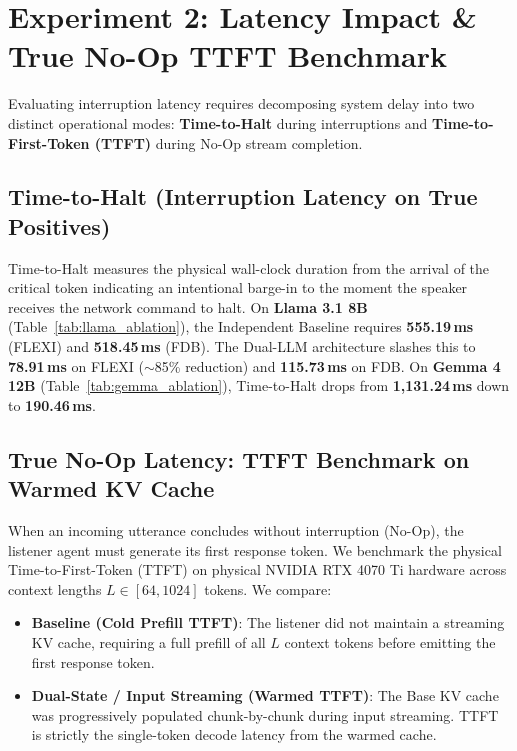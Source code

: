 \documentclass{article}
\begin{document}
\section{Experiment 2: Latency Impact \& True No-Op TTFT Benchmark}

Evaluating interruption latency requires decomposing system delay into two distinct operational modes: \textbf{Time-to-Halt} during interruptions and \textbf{Time-to-First-Token (TTFT)} during No-Op stream completion.

\subsection{Time-to-Halt (Interruption Latency on True Positives)}
Time-to-Halt measures the physical wall-clock duration from the arrival of the critical token indicating an intentional barge-in to the moment the speaker receives the network command to halt. 
On \textbf{Llama 3.1 8B} (Table~\ref{tab:llama_ablation}), the Independent Baseline requires \textbf{555.19\,ms} (FLEXI) and \textbf{518.45\,ms} (FDB). The Dual-LLM architecture slashes this to \textbf{78.91\,ms} on FLEXI ($\sim$85\% reduction) and \textbf{115.73\,ms} on FDB. On \textbf{Gemma 4 12B} (Table~\ref{tab:gemma_ablation}), Time-to-Halt drops from \textbf{1,131.24\,ms} down to \textbf{190.46\,ms}.

\subsection{True No-Op Latency: TTFT Benchmark on Warmed KV Cache}
When an incoming utterance concludes without interruption (No-Op), the listener agent must generate its first response token. We benchmark the physical Time-to-First-Token (TTFT) on physical NVIDIA RTX 4070 Ti hardware across context lengths $L \in [64, 1024]$ tokens. We compare:
\begin{itemize}
    \item \textbf{Baseline (Cold Prefill TTFT)}: The listener did not maintain a streaming KV cache, requiring a full prefill of all $L$ context tokens before emitting the first response token.
    \item \textbf{Dual-State / Input Streaming (Warmed TTFT)}: The Base KV cache was progressively populated chunk-by-chunk during input streaming. TTFT is strictly the single-token decode latency from the warmed cache.
\end{itemize}
\end{document}
